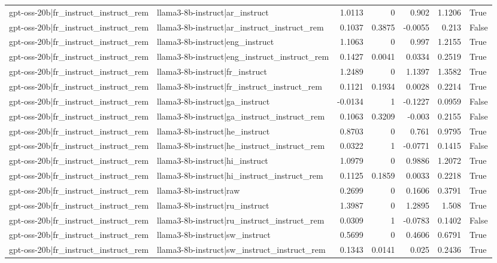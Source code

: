 \begin{table}
\begin{tabular}{l l r r r r l}
gpt-oss-20b|fr_instruct_instruct_rem & llama3-8b-instruct|ar_instruct & 1.0113 & 0 & 0.902 & 1.1206 & True \\
gpt-oss-20b|fr_instruct_instruct_rem & llama3-8b-instruct|ar_instruct_instruct_rem & 0.1037 & 0.3875 & -0.0055 & 0.213 & False \\
gpt-oss-20b|fr_instruct_instruct_rem & llama3-8b-instruct|eng_instruct & 1.1063 & 0 & 0.997 & 1.2155 & True \\
gpt-oss-20b|fr_instruct_instruct_rem & llama3-8b-instruct|eng_instruct_instruct_rem & 0.1427 & 0.0041 & 0.0334 & 0.2519 & True \\
gpt-oss-20b|fr_instruct_instruct_rem & llama3-8b-instruct|fr_instruct & 1.2489 & 0 & 1.1397 & 1.3582 & True \\
gpt-oss-20b|fr_instruct_instruct_rem & llama3-8b-instruct|fr_instruct_instruct_rem & 0.1121 & 0.1934 & 0.0028 & 0.2214 & True \\
gpt-oss-20b|fr_instruct_instruct_rem & llama3-8b-instruct|ga_instruct & -0.0134 & 1 & -0.1227 & 0.0959 & False \\
gpt-oss-20b|fr_instruct_instruct_rem & llama3-8b-instruct|ga_instruct_instruct_rem & 0.1063 & 0.3209 & -0.003 & 0.2155 & False \\
gpt-oss-20b|fr_instruct_instruct_rem & llama3-8b-instruct|he_instruct & 0.8703 & 0 & 0.761 & 0.9795 & True \\
gpt-oss-20b|fr_instruct_instruct_rem & llama3-8b-instruct|he_instruct_instruct_rem & 0.0322 & 1 & -0.0771 & 0.1415 & False \\
gpt-oss-20b|fr_instruct_instruct_rem & llama3-8b-instruct|hi_instruct & 1.0979 & 0 & 0.9886 & 1.2072 & True \\
gpt-oss-20b|fr_instruct_instruct_rem & llama3-8b-instruct|hi_instruct_instruct_rem & 0.1125 & 0.1859 & 0.0033 & 0.2218 & True \\
gpt-oss-20b|fr_instruct_instruct_rem & llama3-8b-instruct|raw & 0.2699 & 0 & 0.1606 & 0.3791 & True \\
gpt-oss-20b|fr_instruct_instruct_rem & llama3-8b-instruct|ru_instruct & 1.3987 & 0 & 1.2895 & 1.508 & True \\
gpt-oss-20b|fr_instruct_instruct_rem & llama3-8b-instruct|ru_instruct_instruct_rem & 0.0309 & 1 & -0.0783 & 0.1402 & False \\
gpt-oss-20b|fr_instruct_instruct_rem & llama3-8b-instruct|sw_instruct & 0.5699 & 0 & 0.4606 & 0.6791 & True \\
gpt-oss-20b|fr_instruct_instruct_rem & llama3-8b-instruct|sw_instruct_instruct_rem & 0.1343 & 0.0141 & 0.025 & 0.2436 & True \\

\end{tabular}
\end{table}
